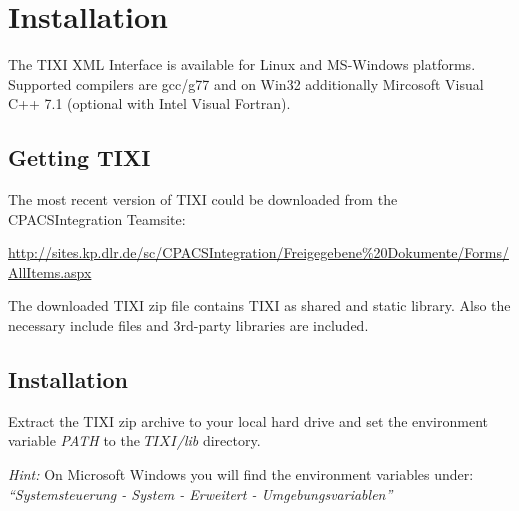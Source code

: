 
\chapter{Installation}\label{hints}

The TIXI XML Interface is available for Linux and MS-Windows platforms. Supported compilers are gcc/g77 and on Win32 additionally Mircosoft Visual C++ 7.1 (optional with Intel Visual Fortran).


\section{Getting TIXI}\label{gettingTIXI}
The most recent version of TIXI could be downloaded from the CPACSIntegration Teamsite:

\url{http://sites.kp.dlr.de/sc/CPACSIntegration/Freigegebene\%20Dokumente/Forms/AllItems.aspx}

The downloaded TIXI zip file contains TIXI as shared and static library. Also the necessary include files and 3rd-party libraries are included. 



\section{Installation}
Extract the TIXI zip archive to your local hard drive and set the environment variable \emph{PATH} to the \emph{$TIXI$/lib} directory. 

\emph{Hint:} On Microsoft Windows you will find the environment variables under: \textit{"`Systemsteuerung - System - Erweitert - Umgebungsvariablen"'}





